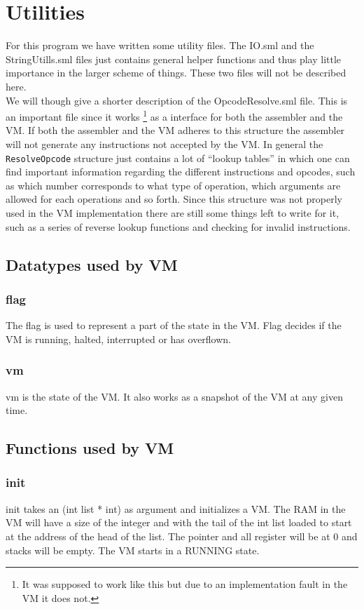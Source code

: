 \documentclass{article}
\newcommand{\V}{\verb}
\begin{document}
\section{Utilities}
For this program we have written some utility files. The IO.sml and the
StringUtills.sml files just contains general helper functions and thus play
little importance in the larger scheme of things. These two files will not be
described here.
\\
We will though give a shorter description of the OpcodeResolve.sml file. This is
an important file since it works \footnote{It was supposed to work like this
but due to an implementation fault in the VM it does not.} as a interface for both
the assembler and the VM. If both the assembler and the VM adheres to this
structure the assembler will not generate any instructions not accepted by the
VM. In general the \V+ResolveOpcode+ structure just contains a lot of ``lookup
tables'' in which one can find important information regarding the different
instructions and opcodes, such as which number corresponds to what type of operation, which
arguments are allowed for each operations and so forth.
Since this structure was not properly used in the VM implementation there are
still some things left to write for it, such as a series of reverse lookup
functions and checking for invalid instructions.

\subsection{Datatypes used by VM}

\subsubsection{flag}
The flag is used to represent a part of the state in the VM. Flag decides if the VM is running, halted, interrupted or has overflown.

\subsubsection{vm}
vm is the state of the VM. It also works as a snapshot of the VM at any given time.

\subsection{Functions used by VM}

\subsubsection{init}
init takes an (int list * int) as argument and initializes a VM. The RAM in the VM will have a size of the integer and with the tail of the int list loaded to start at the address of the head of the list. The pointer and all register will be at 0 and stacks will be empty. The VM starts in a RUNNING state.
\end{document}
